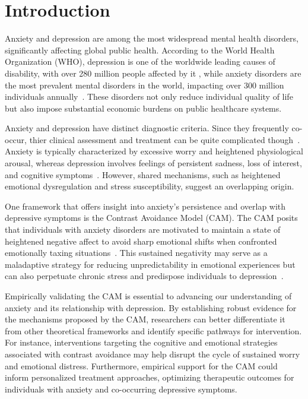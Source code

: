 \section{Introduction}
\label{sec:intro}


Anxiety and depression are among the most widespread mental health disorders, significantly affecting global public health. According to the World Health Organization (WHO), depression is one of the worldwide leading causes of disability, with over 280 million people affected by it \citep{who2023depression}, while anxiety disorders are the most prevalent mental disorders in the world, impacting over 300 million individuals annually~\citep{who2023anxiety}. These disorders not only reduce individual quality of life but also impose substantial economic burdens on public healthcare systems.

Anxiety and depression have distinct diagnostic criteria. Since they frequently co-occur, thier clinical assessment and treatment can be quite complicated though~\citep{kessler2003epidemiology}. Anxiety is typically characterized by excessive worry and heightened physiological arousal, whereas depression involves feelings of persistent sadness, loss of interest, and cognitive symptoms~\citep{apa2013dsm}. However, shared mechanisms, such as heightened emotional dysregulation and stress susceptibility, suggest an overlapping origin.

One framework that offers insight into anxiety's persistence and overlap with depressive symptoms is the Contrast Avoidance Model (CAM). The CAM posits that individuals with anxiety disorders are motivated to maintain a state of heightened negative affect to avoid sharp emotional shifts when confronted emotionally taxing situations~\citep{newman2011contrast}. This sustained negativity may serve as a maladaptive strategy for reducing unpredictability in emotional experiences but can also perpetuate chronic stress and predispose individuals to depression~\citep{llera2014emotional}.

Empirically validating the CAM is essential to advancing our understanding of anxiety and its relationship with depression. By establishing robust evidence for the mechanisms proposed by the CAM, researchers can better differentiate it from other theoretical frameworks and identify specific pathways for intervention. For instance, interventions targeting the cognitive and emotional strategies associated with contrast avoidance may help disrupt the cycle of sustained worry and emotional distress. Furthermore, empirical support for the CAM could inform personalized treatment approaches, optimizing therapeutic outcomes for individuals with anxiety and co-occurring depressive symptoms.

